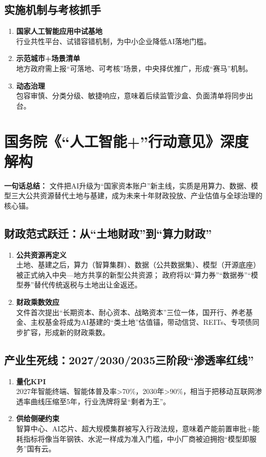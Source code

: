 \subsection{实施机制与考核抓手}
\begin{enumerate}[leftmargin=*, nosep]
    \item \textbf{国家人工智能应用中试基地}  \\
    行业共性平台、试错容错机制，为中小企业降低AI落地门槛。
    \item \textbf{示范城市+场景清单}  \\
    地方政府需上报“可落地、可考核”场景，中央择优推广，形成“赛马”机制。
    \item \textbf{动态治理}  \\
    包容审慎、分类分级、敏捷响应，意味着后续监管沙盒、负面清单将同步出台。
\end{enumerate}


\section{国务院《“人工智能+”行动意见》深度解构}

\textbf{一句话总结：}  
文件把AI升级为“国家资本账户”新主线，实质是用算力、数据、模型三大公共资源替代土地与基建，成为未来十年财政投放、产业估值与全球治理的核心锚。

\subsection{财政范式跃迁：从“土地财政”到“算力财政”}
\begin{enumerate}[leftmargin=*, nosep]
    \item \textbf{公共资源再定义}  \\
    土地、基建之后，算力（智算集群）、数据（公共数据集）、模型（开源底座）被正式纳入中央—地方共享的新型公共资源；  
    政府将以“算力券”“数据券”“模型券”替代传统返税与土地出让金返还。
    \item \textbf{财政乘数效应}  \\
    文件首次提出“长期资本、耐心资本、战略资本”三位一体，国开行、养老基金、主权基金将成为AI基建的“类土地”估值锚，带动信贷、REITs、专项债同步扩容，形成新的财政乘数。
\end{enumerate}

\subsection{产业生死线：2027/2030/2035三阶段“渗透率红线”}
\begin{enumerate}[leftmargin=*, nosep]
    \item \textbf{量化KPI}  \\
    2027年智能终端、智能体普及率>70\%，2030年>90\%，相当于把移动互联网渗透率曲线压缩至5年，行业洗牌将呈“剩者为王”。
    \item \textbf{供给侧硬约束}  \\
    智算中心、AI芯片、超大规模集群被写入行政法规，意味着产能前置审批+能耗指标将像当年钢铁、水泥一样成为准入门槛，中小厂商被迫拥抱“模型即服务”国有云。
\end{enumerate}

